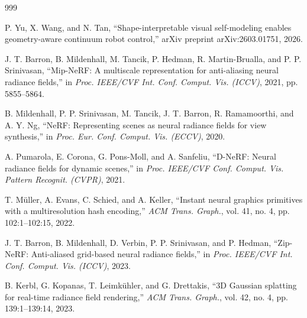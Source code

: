 \documentclass[12pt,a4paper,oneside]{report}
\begin{document}
\begin{thebibliography}{999}

P. Yu, X. Wang, and N. Tan, ``Shape-interpretable visual self-modeling enables geometry-aware continuum robot control,'' arXiv preprint arXiv:2603.01751, 2026.




J. T. Barron, B. Mildenhall, M. Tancik, P. Hedman, R. Martin-Brualla, and P. P. Srinivasan, ``{Mip-NeRF}: A multiscale representation for anti-aliasing neural radiance fields,'' in \textit{Proc. IEEE/CVF Int. Conf. Comput. Vis. (ICCV)}, 2021, pp. 5855--5864.




B. Mildenhall, P. P. Srinivasan, M. Tancik, J. T. Barron, R. Ramamoorthi, and A. Y. Ng, ``NeRF: Representing scenes as neural radiance fields for view synthesis,'' in \textit{Proc. Eur. Conf. Comput. Vis. (ECCV)}, 2020.




A. Pumarola, E. Corona, G. Pons-Moll, and A. Sanfeliu, ``D-NeRF: Neural radiance fields for dynamic scenes,'' in \textit{Proc. IEEE/CVF Conf. Comput. Vis. Pattern Recognit. (CVPR)}, 2021.




T. M\"uller, A. Evans, C. Schied, and A. Keller, ``Instant neural graphics primitives with a multiresolution hash encoding,'' \textit{ACM Trans. Graph.}, vol. 41, no. 4, pp. 102:1--102:15, 2022.




J. T. Barron, B. Mildenhall, D. Verbin, P. P. Srinivasan, and P. Hedman, ``Zip-NeRF: Anti-aliased grid-based neural radiance fields,'' in \textit{Proc. IEEE/CVF Int. Conf. Comput. Vis. (ICCV)}, 2023.





B. Kerbl, G. Kopanas, T. Leimk\"{u}hler, and G. Drettakis, ``{3D} Gaussian splatting for real-time radiance field rendering,'' \textit{ACM Trans. Graph.}, vol. 42, no. 4, pp. 139:1--139:14, 2023.





\end{thebibliography}
\end{document}
